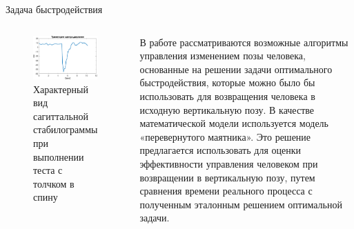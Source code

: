 \documentclass[10pt]{beamer}
\begin{document}
\begin{frame}{Задача быстродействия}
	\begin{columns}
		\begin{figure}[h!]
			\includegraphics[width=1.1\linewidth]{images/center_of_pressure.eps}
			\caption{Характерный вид сагиттальной стабилограммы при выполнении теста с толчком в спину}
		\end{figure}
		В работе рассматриваются возможные алгоритмы управления изменением
		позы человека, основанные на решении задачи оптимального быстродействия,
		которые можно было бы использовать для возвращения человека в исходную
		вертикальную позу. В качестве математической модели используется модель
		«перевернутого маятника». Это решение предлагается использовать для
		оценки эффективности управления человеком при возвращении в
		вертикальную позу, путем сравнения времени реального процесса с полученным
		эталонным решением оптимальной задачи.
	\end{columns}
\end{frame}
\end{document}

